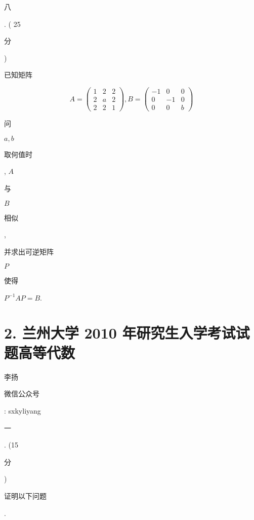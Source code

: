 \documentclass[10pt]{article}
\begin{document}
\begin{CJK}{UTF8}{mj}八\end{CJK}. ( 25 \begin{CJK}{UTF8}{mj}分\end{CJK}) \begin{CJK}{UTF8}{mj}已知矩阵\end{CJK}
$$
A=\left(\begin{array}{lll}
1 & 2 & 2 \\
2 & a & 2 \\
2 & 2 & 1
\end{array}\right), B=\left(\begin{array}{ccc}
-1 & 0 & 0 \\
0 & -1 & 0 \\
0 & 0 & b
\end{array}\right)
$$
\begin{CJK}{UTF8}{mj}问\end{CJK} $a, b$ \begin{CJK}{UTF8}{mj}取何值时\end{CJK}, $A$ \begin{CJK}{UTF8}{mj}与\end{CJK} $B$ \begin{CJK}{UTF8}{mj}相似\end{CJK}, \begin{CJK}{UTF8}{mj}并求出可逆矩阵\end{CJK} $P$ \begin{CJK}{UTF8}{mj}使得\end{CJK} $P^{-1} A P=B$.

\section{2. 兰州大学 2010 年研究生入学考试试题高等代数}
\begin{CJK}{UTF8}{mj}李扬\end{CJK}

\begin{CJK}{UTF8}{mj}微信公众号\end{CJK}: sxkyliyang

\begin{CJK}{UTF8}{mj}一\end{CJK}. (15 \begin{CJK}{UTF8}{mj}分\end{CJK}) \begin{CJK}{UTF8}{mj}证明以下问题\end{CJK}.
\end{document}
